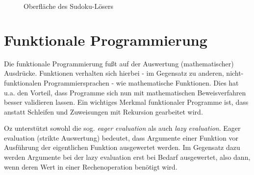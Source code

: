 \begin{figure}
   \centering
   \caption{Oberfläche des Sudoku-Lösers}
   \label{fig:sudoku-solver}
\end{figure}

\section{Funktionale Programmierung}
Die funktionale Programmierung fußt auf der Auswertung (mathematischer)
Ausdrücke. Funktionen verhalten sich hierbei - im Gegensatz zu anderen,
nicht-funktionalen Programmiersprachen - wie mathematische Funktionen. Dies hat
u.a. den Vorteil, dass Programme sich nun mit mathematischen Beweisverfahren
besser validieren lassen. Ein wichtiges Merkmal funktionaler Programme ist, dass
anstatt Schleifen und Zuweisungen mit Rekursion gearbeitet wird.

Oz unterstützt sowohl die sog. \textsl{eager evaluation} als auch
\textsl{lazy evaluation}. Eager evaluation (strikte Auswertung) bedeutet, dass
Argumente einer Funktion vor Ausführung der eigentlichen Funktion ausgewertet
werden. Im Gegensatz dazu werden Argumente bei der lazy evaluation erst bei
Bedarf ausgewertet, also dann, wenn deren Wert in einer Rechenoperation benötigt
wird.

